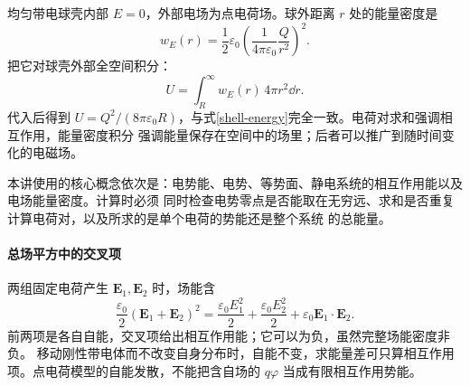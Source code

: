 均匀带电球壳内部 $E=0$，外部电场为点电荷场。球外距离 $r$ 处的能量密度是
\[
  w_E(r)=\frac12\varepsilon_0
  \left(\frac{1}{4\pi\varepsilon_0}\frac{Q}{r^2}\right)^2.
\]
把它对球壳外部全空间积分：
\begin{equation}
  \boxed{U=\int_R^\infty w_E(r)\,4\pi r^2\dd r}.
\end{equation}
代入后得到 $U=Q^2/(8\pi\varepsilon_0R)$，与式\eqref{shell-energy}完全一致。电荷对求和强调相互作用，能量密度积分
强调能量保存在空间中的场里；后者可以推广到随时间变化的电磁场。

本讲使用的核心概念依次是：电势能、电势、等势面、静电系统的相互作用能以及电场能量密度。计算时必须
同时检查电势零点是否能取在无穷远、求和是否重复计算电荷对，以及所求的是单个电荷的势能还是整个系统
的总能量。

\paragraph{总场平方中的交叉项}
两组固定电荷产生 $\boldsymbol E_1,\boldsymbol E_2$ 时，场能含
\[
 \frac{\varepsilon_0}{2}(\boldsymbol E_1+\boldsymbol E_2)^2
 =\frac{\varepsilon_0E_1^2}{2}+\frac{\varepsilon_0E_2^2}{2}
 +\varepsilon_0\boldsymbol E_1\cdot\boldsymbol E_2.
\]
前两项是各自自能，交叉项给出相互作用能；它可以为负，虽然完整场能密度非负。
移动刚性带电体而不改变自身分布时，自能不变，求能量差可只算相互作用项。点电荷模型的自能发散，不能把含自场的 $q\varphi$ 当成有限相互作用势能。

